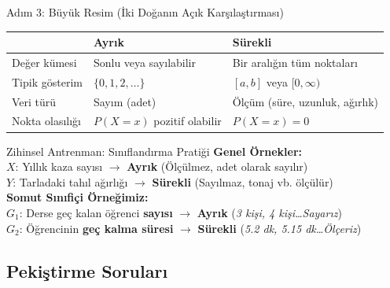 \documentclass[light]{lutbeamer}
\begin{document}
\begin{frame}{Adım 3: Büyük Resim (İki Doğanın Açık Karşılaştırması)}
\footnotesize
\centering
\begin{tabular}{p{} p{} p{}}
\toprule
 & \textbf{Ayrık} & \textbf{Sürekli} \\
\midrule
Değer kümesi & Sonlu veya sayılabilir & Bir aralığın tüm noktaları \\
Tipik gösterim & $\{0, 1, 2, \dots\}$ & $[a, b]$ veya $[0, \infty)$ \\
Veri türü & Sayım (adet) & Ölçüm (süre, uzunluk, ağırlık) \\
Nokta olasılığı & $P(X=x)$ pozitif olabilir & $P(X=x) = 0$ \\
\bottomrule
\end{tabular}

\vspace{0.3cm}
\begin{block}{Zihinsel Antrenman: Sınıflandırma Pratiği}
  \textbf{Genel Örnekler:} \\
  $X$: Yıllık kaza sayısı $\to$ \textbf{Ayrık} (Ölçülmez, adet olarak sayılır) \\
  $Y$: Tarladaki tahıl ağırlığı $\to$ \textbf{Sürekli} (Sayılmaz, tonaj vb. ölçülür) \\
  
  \vspace{0.15cm}
  {\color{blue!80!black} \textbf{Somut Sınıfiçi Örneğimiz:}} \\
  $G_1$: Derse geç kalan öğrenci \textbf{sayısı} $\to$ \textbf{Ayrık} (\textit{3 kişi, 4 kişi\dots Sayarız}) \\
  $G_2$: Öğrencinin \textbf{geç kalma süresi} $\to$ \textbf{Sürekli} (\textit{5.2 dk, 5.15 dk\dots Ölçeriz})
\end{block}
\end{frame}

\subsection{Pekiştirme Soruları}
\end{document}
